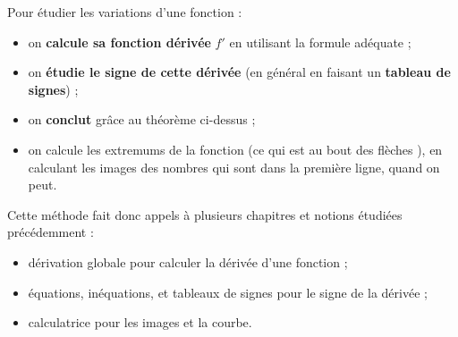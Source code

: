 \documentclass[a4paper,11pt]{article}
\begin{document}
\begin{cmethode}
Pour étudier les variations d'une fonction :
\begin{itemize}
	\item on \textbf{calcule sa fonction dérivée} $f'$ en utilisant la formule adéquate ;
	\item on \textbf{étudie le signe de cette dérivée} (en général en faisant un \textbf{tableau de signes}) ;
	\item on \textbf{conclut} grâce au théorème ci-dessus ; 
	\item on calcule les extremums de la fonction (ce qui est au \og bout des flèches \fg), en calculant les images des nombres qui sont dans la première ligne, quand on peut.
\end{itemize}
\end{cmethode}

\begin{crmq}[s]
Cette méthode fait donc appels à plusieurs chapitres et notions étudiées précédemment :
\begin{itemize}
	\item dérivation globale pour calculer la dérivée d'une fonction ;
	\item équations, inéquations, et tableaux de signes pour le signe de la dérivée ;
	\item calculatrice pour les images et la courbe.
\end{itemize}
\end{crmq}
\end{document}
